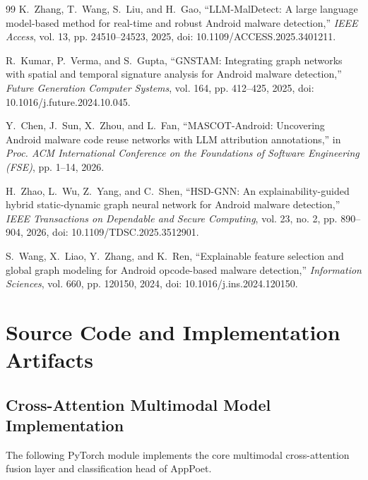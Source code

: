 \documentclass[12pt,a4paper,oneside]{report}
\begin{document}
\begin{thebibliography}{99}
K.~Zhang, T.~Wang, S.~Liu, and H.~Gao,
``LLM-MalDetect: A large language model-based method for real-time and robust Android malware detection,''
\textit{IEEE Access},
vol. 13, pp. 24510--24523, 2025,
doi: 10.1109/ACCESS.2025.3401211.

R.~Kumar, P.~Verma, and S.~Gupta,
``GNSTAM: Integrating graph networks with spatial and temporal signature analysis for Android malware detection,''
\textit{Future Generation Computer Systems},
vol. 164, pp. 412--425, 2025,
doi: 10.1016/j.future.2024.10.045.

Y.~Chen, J.~Sun, X.~Zhou, and L.~Fan,
``MASCOT-Android: Uncovering Android malware code reuse networks with LLM attribution annotations,''
in \textit{Proc. ACM International Conference on the Foundations of Software Engineering (FSE)},
pp. 1--14, 2026.

H.~Zhao, L.~Wu, Z.~Yang, and C.~Shen,
``HSD-GNN: An explainability-guided hybrid static-dynamic graph neural network for Android malware detection,''
\textit{IEEE Transactions on Dependable and Secure Computing},
vol. 23, no. 2, pp. 890--904, 2026,
doi: 10.1109/TDSC.2025.3512901.

S.~Wang, X.~Liao, Y.~Zhang, and K.~Ren,
``Explainable feature selection and global graph modeling for Android opcode-based malware detection,''
\textit{Information Sciences},
vol. 660, pp. 120150, 2024,
doi: 10.1016/j.ins.2024.120150.

\end{thebibliography}

\clearpage
\appendix
\chapter{Source Code and Implementation Artifacts}
\section{Cross-Attention Multimodal Model Implementation}
The following PyTorch module implements the core multimodal cross-attention fusion layer and classification head of AppPoet.
\end{document}
